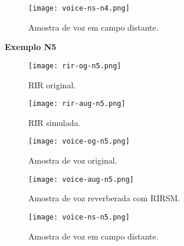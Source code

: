 \begin{figure} [H]
    \centering
    \texttt{[image: voice-ns-n4.png]}
    \caption{Amostra de voz em campo distante.}
    \label{fig-a:voice-ns-n4}
\end{figure}

\pagebreak
{\Large \textbf{Exemplo N5}}

\begin{figure} [H]
    \centering
    \texttt{[image: rir-og-n5.png]}
    \caption{RIR original.}
    \label{fig-a:rir-og-n5}
\end{figure} 

\begin{figure} [H]
    \centering
    \texttt{[image: rir-aug-n5.png]}
    \caption{RIR simulada.}
    \label{fig-a:rir-aug-n5}
\end{figure} 

\begin{figure} [H]
    \centering
    \texttt{[image: voice-og-n5.png]}
    \caption{Amostra de voz original.}
    \label{fig-a:voice-og-n5}
\end{figure} 

\begin{figure} [H]
    \centering
    \texttt{[image: voice-aug-n5.png]}
    \caption{Amostra de voz reverberada com RIRSM.}
    \label{fig-a:voice-aug-n5}
\end{figure}

\begin{figure} [H]
    \centering
    \texttt{[image: voice-ns-n5.png]}
    \caption{Amostra de voz em campo distante.}
    \label{fig-a:voice-ns-n5}
\end{figure}